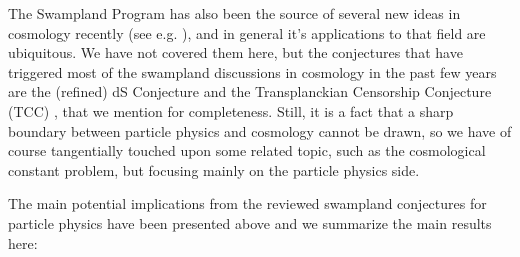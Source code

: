 \documentclass[11pt,a4paper]{article}
\begin{document}
The Swampland Program has also been the source of several new ideas in cosmology recently (see e.g. \cite{Agrawal:2018own, Cicoli:2018kdo, Agrawal:2019dlm,Bedroya:2019tba,Agrawal:2020xek}), and in general it's applications to that field are ubiquitous. We have not covered them here, but the conjectures that have triggered most of the swampland discussions in cosmology in the past few years are the (refined) dS Conjecture \cite{dS1, dS2,dS3} and the Transplanckian Censorship Conjecture (TCC) \cite{Bedroya:2019snp}, that we mention for completeness. Still, it is a fact that a sharp boundary between particle physics and cosmology cannot be drawn, so we have of course tangentially touched upon some related topic, such as the cosmological constant problem, but focusing mainly on the particle physics side. 

The main potential implications from the reviewed swampland conjectures for particle physics have been presented above and we summarize the main results here:
\end{document}
